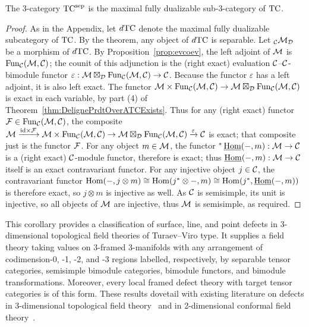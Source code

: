 \documentclass{amsart}
\begin{document}
\begin{corollary} \label{cor:maxfd}
The 3-category ${\mathrm{TC}^{\mathrm{sep}}}$ is the maximal fully dualizable sub-3-category of $\mathrm{TC}$.
\end{corollary}
\begin{proof}
As in the Appendix, let $d\mathrm{TC}$ denote the maximal fully dualizable subcategory of $\mathrm{TC}$.  By the theorem, any object of $d\mathrm{TC}$ is separable.  Let ${}_\mathcal C \mathcal M_\mathcal D$ be a morphism of $d\mathrm{TC}$.  By Proposition~\ref{prop:evcoev}, the left adjoint of $\mathcal M$ is $\operatorname{Fun}_\mathcal C(\mathcal M,\mathcal C)$; the counit of this adjunction is the (right exact) evaluation $\mathcal C$--$\mathcal C$-bimodule functor $\varepsilon: \mathcal M \boxtimes_\mathcal D \operatorname{Fun}_\mathcal C(\mathcal M,\mathcal C) \rightarrow \mathcal C$.  Because the functor $\varepsilon$ has a left adjoint, it is also left exact.  The functor $\mathcal M \times \operatorname{Fun}_\mathcal C(\mathcal M,\mathcal C) \rightarrow \mathcal M \boxtimes_\mathcal D \operatorname{Fun}_\mathcal C(\mathcal M,\mathcal C)$ is exact in each variable, by part (4) of Theorem~\ref{thm:DelignePrdtOverATCExists}.  Thus for any (right exact) functor $\mathcal F \in \operatorname{Fun}_\mathcal C(\mathcal M,\mathcal C)$, the composite $\mathcal M \xrightarrow{\mathrm{id} \times \mathcal F} \mathcal M \times \operatorname{Fun}_\mathcal C(\mathcal M,\mathcal C) \rightarrow \mathcal M \boxtimes_\mathcal D \operatorname{Fun}_\mathcal C(\mathcal M,\mathcal C) \xrightarrow{\varepsilon} \mathcal C$ is exact; that composite just is the functor $\mathcal F$.  For any object $m \in \mathcal M$, the functor ${}^* \operatorname{\underline{Hom}}(-,m) : \mathcal M \rightarrow \mathcal C$ is a (right exact) $\mathcal C$-module functor, therefore is exact; thus $\operatorname{\underline{Hom}}(-,m) : \mathcal M \rightarrow \mathcal C$ itself is an exact contravariant functor.  For any injective object $j \in \mathcal C$, the contravariant functor $\operatorname{Hom}(-,j \otimes m) \cong \operatorname{Hom}(j^* \otimes -,m) \cong \operatorname{Hom}(j^*,\operatorname{\underline{Hom}}(-,m))$ is therefore exact, so $j \otimes m$ is injective as well.  As $\mathcal C$ is semisimple, its unit is injective, so all objects of $\mathcal M$ are injective, thus $\mathcal M$ is semisimple, as required.
\end{proof}

\begin{remark}
This corollary provides a classification of surface, line, and point defects in 3-dimensional topological field theories of Turaev--Viro type.  It supplies a field theory taking values on 3-framed 3-manifolds with any arrangement of codimension-0, -1, -2, and -3 regions labelled, respectively, by separable tensor categories, semisimple bimodule categories, bimodule functors, and bimodule transformations.  Moreover, every local framed defect theory with target tensor categories is of this form.  These results dovetail with existing literature on defects in 3-dimensional topological field theory~\cite{kapustinsaulina,kitaevkong,fsv} and in 2-dimensional conformal field theory~\cite{ffrs-duality,frs-fusion}.
\end{remark}
\end{document}
